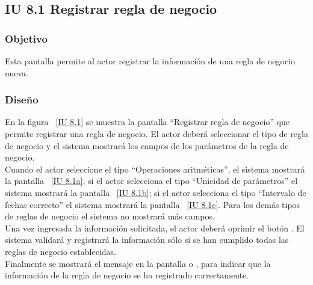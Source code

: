 \subsection{IU 8.1 Registrar regla de negocio}

\subsubsection{Objetivo}
	
	Esta pantalla permite al actor registrar la información de una regla de negocio nueva.

\subsubsection{Diseño}

    En la figura ~\ref{IU 8.1} se muestra la pantalla ``Registrar regla de negocio'' que permite registrar una regla de negocio. El actor deberá 
    seleccionar el tipo de regla de negocio y el sistema mostrará los campos de los parámetros de la regla de negocio. \\
    
    Cuando el actor seleccione el tipo ``Operaciones aritméticas'', el sistema mostrará la pantalla ~\ref{IU 8.1a}; si el actor selecciona el tipo
    ``Unicidad de parámetros'' el sistema mostrará la pantalla ~\ref{IU 8.1b}; si el actor selecciona el tipo ``Intervalo de fechas correcto'' el sistema
    mostrará la pantalla ~\ref{IU 8.1c}. Para los demás tipos de reglas de negocio el sistema no mostrará más campos.\\
    
    Una vez ingresada la información solicitada, el actor deberá oprimir el botón . El sistema validará y registrará la 
    información sólo si se han cumplido todas las reglas de negocio establecidas.  \\
    
    Finalmente se mostrará el mensaje  en la pantalla  o , 
    para indicar que la información de la regla de negocio
    se ha registrado correctamente.        



